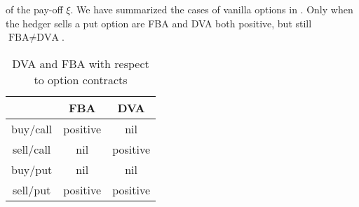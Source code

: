 \documentclass[a4paper, 11pt]{article}              %
\numberwithin{equation}{section}
\theoremstyle{plain}
\newcommand{\1}{\mathds{1}}
\theoremstyle{plain}
\theoremstyle{definition}
\theoremstyle{plain}
\begin{document}
of the pay-off $\xi$. We have summarized the cases of vanilla options in
. Only when the hedger sells a put option are FBA and DVA 
both positive, but still $\text{FBA}\not=\text{DVA}$.
\begin{table}[htp]
  \centering
\begin{tabular}{ |c | c | c |}
    \hline
     & FBA  &  DVA \\ \hline
    buy/call & positive &  nil\\ \hline
  sell/call & nil &  positive\\ \hline
    buy/put & nil&  nil \\ \hline
    sell/put &  positive &  positive \\ \hline
\end{tabular}
\caption{DVA and FBA with respect to option contracts}  
\label{table:FBA.DVA}     
\end{table}
\end{document}
